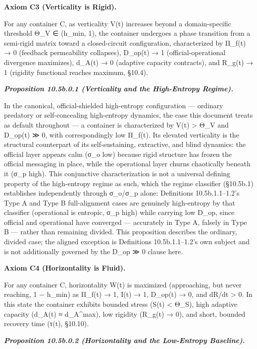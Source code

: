 \documentclass[
]{article}
\begin{document}
\textbf{Axiom C3 (Verticality is Rigid).}

For any container C, as verticality V(t) increases beyond a
domain-specific threshold Θ\_V ∈ (h\_min, 1), the container undergoes a
phase transition from a semi-rigid matrix toward a closed-circuit
configuration, characterized by Π\_f(t) → 0 (feedback permeability
collapses), D\_op(t) → 1 (official-operational divergence maximizes),
d\_A(t) → 0 (adaptive capacity contracts), and R\_g(t) → 1 (rigidity
functional reaches maximum, §10.4).

\emph{\textbf{Proposition 10.5b.0.1 (Verticality and the High-Entropy
Regime).}}

In the canonical, official-shielded high-entropy configuration ---
ordinary predatory or self-concealing high-entropy dynamics, the case
this document treats as default throughout --- a container is
characterized by V(t) \textgreater{} Θ\_V and D\_op(t) ≫ 0, with
correspondingly low Π\_f(t). Its elevated verticality is the structural
counterpart of its self-sustaining, extractive, and blind dynamics: the
official layer appears calm (σ\_o low) because rigid structure has
frozen the official messaging in place, while the operational layer
churns chaotically beneath it (σ\_p high). This conjunctive
characterization is not a universal defining property of the
high-entropy regime as such, which the regime classifier (§10.5b.1)
establishes independently through σ\_o/σ\_p alone: Definitions
10.5b.1.1--1.2's Type A and Type B full-alignment cases are genuinely
high-entropy by that classifier (operational is entropic, σ\_p high)
while carrying low D\_op, since official and operational have converged
--- accurately in Type A, falsely in Type B --- rather than remaining
divided. This proposition describes the ordinary, divided case; the
aligned exception is Definitions 10.5b.1.1--1.2's own subject and is not
additionally governed by the D\_op ≫ 0 clause here.

\textbf{Axiom C4 (Horizontality is Fluid).}

For any container C, horizontality W(t) is maximized (approaching, but
never reaching, 1 − h\_min) as Π\_f(t) → 1, I(t) → 1, D\_op(t) → 0, and
dR/dt \textgreater{} 0. In this state the container exhibits bounded
stress (S(t) \textless{} Θ\_S), high adaptive capacity (d\_A(t) ≈
d\_A\^{}max), low rigidity (R\_g(t) → 0), and short, bounded recovery
time (τ(t), §10.10).

\emph{\textbf{Proposition 10.5b.0.2 (Horizontality and the Low-Entropy
Baseline).}}
\end{document}
